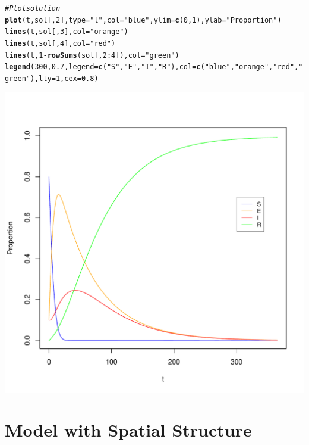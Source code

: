 \documentclass{article}\usepackage[]{graphicx}\usepackage[]{color}
\makeatletter
\def\maxwidth{ %
  \ifdim\Gin@nat@width>\linewidth
    \linewidth
  \else
    \Gin@nat@width
  \fi
}
\newcommand{\hlnum}[1]{\textcolor[rgb]{0.686,0.059,0.569}{#1}}%
\newcommand{\hlstr}[1]{\textcolor[rgb]{0.192,0.494,0.8}{#1}}%
\newcommand{\hlcom}[1]{\textcolor[rgb]{0.678,0.584,0.686}{\textit{#1}}}%
\newcommand{\hlopt}[1]{\textcolor[rgb]{0,0,0}{#1}}%
\newcommand{\hlstd}[1]{\textcolor[rgb]{0.345,0.345,0.345}{#1}}%
\newcommand{\hlkwc}[1]{\textcolor[rgb]{0.333,0.667,0.333}{#1}}%
\newcommand{\hlkwd}[1]{\textcolor[rgb]{0.737,0.353,0.396}{\textbf{#1}}}%
\newenvironment{kframe}{%
 \def\at@end@of@kframe{}%
 \ifinner\ifhmode%
  \def\at@end@of@kframe{\end{minipage}}%
  \begin{minipage}{\columnwidth}%
 \fi\fi%
 \def\FrameCommand##1{\hskip\@totalleftmargin \hskip-\fboxsep
 \colorbox{shadecolor}{##1}\hskip-\fboxsep
     \hskip-\linewidth \hskip-\@totalleftmargin \hskip\columnwidth}%
 \MakeFramed {\advance\hsize-\width
   \@totalleftmargin\z@ \linewidth\hsize
   \@setminipage}}%
 {\par\unskip\endMakeFramed%
 \at@end@of@kframe}
\newenvironment{knitrout}{}{} %
\makeatother
\begin{document}
\begin{knitrout}
\begin{kframe}
\begin{alltt}
\hlcom{# Plot solution}
\hlkwd{plot}\hlstd{(t,sol[,}\hlnum{2}\hlstd{],}\hlkwc{type}\hlstd{=}\hlstr{"l"}\hlstd{,}\hlkwc{col}\hlstd{=}\hlstr{"blue"}\hlstd{,}\hlkwc{ylim}\hlstd{=}\hlkwd{c}\hlstd{(}\hlnum{0}\hlstd{,}\hlnum{1}\hlstd{),}\hlkwc{ylab}\hlstd{=}\hlstr{"Proportion"}\hlstd{)}
\hlkwd{lines}\hlstd{(t,sol[,}\hlnum{3}\hlstd{],}\hlkwc{col}\hlstd{=}\hlstr{"orange"}\hlstd{)}
\hlkwd{lines}\hlstd{(t,sol[,}\hlnum{4}\hlstd{],}\hlkwc{col}\hlstd{=}\hlstr{"red"}\hlstd{)}
\hlkwd{lines}\hlstd{(t,}\hlnum{1}\hlopt{-}\hlkwd{rowSums}\hlstd{(sol[,}\hlnum{2}\hlopt{:}\hlnum{4}\hlstd{]),}\hlkwc{col}\hlstd{=}\hlstr{"green"}\hlstd{)}
\hlkwd{legend}\hlstd{(}\hlnum{300}\hlstd{,}\hlnum{0.7}\hlstd{,}\hlkwc{legend}\hlstd{=}\hlkwd{c}\hlstd{(}\hlstr{"S"}\hlstd{,}\hlstr{"E"}\hlstd{,}\hlstr{"I"}\hlstd{,}\hlstr{"R"}\hlstd{),}\hlkwc{col}\hlstd{=}\hlkwd{c}\hlstd{(}\hlstr{"blue"}\hlstd{,}\hlstr{"orange"}\hlstd{,}\hlstr{"red"}\hlstd{,}\hlstr{"green"}\hlstd{),} \hlkwc{lty}\hlstd{=}\hlnum{1}\hlstd{,} \hlkwc{cex}\hlstd{=}\hlnum{0.8}\hlstd{)}
\end{alltt}
\end{kframe}
\includegraphics[width=\maxwidth]{figure/unnamed-chunk-6-1} 

\end{knitrout}


\section{Model with Spatial Structure}
\end{document}
